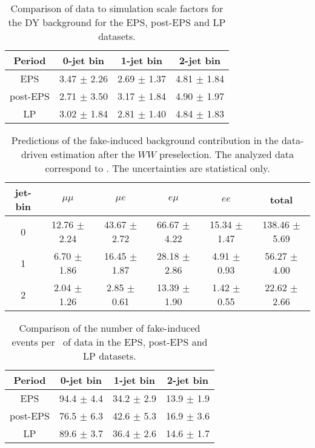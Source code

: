 \begin{table}[!htbp]
\begin{center}
\begin{tabular}{c c c c} 
\hline
Period & 0-jet bin & 1-jet bin & 2-jet bin \\ 
\hline
EPS      & 3.47 $\pm$ 2.26 & 2.69 $\pm$ 1.37 & 4.81 $\pm$ 1.84 \\
post-EPS & 2.71 $\pm$ 3.50 & 3.17 $\pm$ 1.84 & 4.90 $\pm$ 1.97 \\
LP       & 3.02 $\pm$ 1.84 & 2.81 $\pm$ 1.40 & 4.84 $\pm$ 1.83 \\
\hline
\end{tabular}
\caption{Comparison of data to simulation scale factors for the DY background for the EPS, post-EPS and LP datasets.}
\label{tab:lp_periods_dy}
\end{center}
\end{table}

\begin{table}[!htbp]
\begin{center}
\begin{tabular}{c c c c c c} 
\hline
jet-bin &	 $\mu\mu$ &	 $\mu e$ &	 $e\mu$ &	 $ee$ &	 total \\ 
\hline
0 &	 12.76 $\pm$ 2.24 &	 43.67 $\pm$ 2.72 &	 66.67 $\pm$ 4.22 &	 15.34 $\pm$ 1.47 &	 138.46 $\pm$ 5.69 \\
1 &	 6.70 $\pm$ 1.86  &      16.45 $\pm$ 1.87 &      28.18 $\pm$ 2.86 &       4.91 $\pm$ 0.93 &       56.27 $\pm$ 4.00 \\
2 &	 2.04 $\pm$ 1.26  &       2.85 $\pm$ 0.61 &      13.39 $\pm$ 1.90 &       1.42 $\pm$ 0.55 &       22.62 $\pm$ 2.66 \\
\hline
\end{tabular}
\caption{Predictions of the fake-induced background contribution 
in the data-driven estimation after the $WW$ preselection. 
The analyzed data correspond to \lpintlumi.
The uncertainties are statistical only.}
\label{tab:lp_fake_est}
\end{center}
\end{table}

\begin{table}[!htbp]
\begin{center}
\begin{tabular}{c c c c}
\hline
Period & 0-jet bin & 1-jet bin & 2-jet bin \\
\hline
EPS      & 94.4 $\pm$ 4.4 & 34.2 $\pm$ 2.9 & 13.9 $\pm$ 1.9 \\
post-EPS & 76.5 $\pm$ 6.3 & 42.6 $\pm$ 5.3 & 16.9 $\pm$ 3.6 \\
LP       & 89.6 $\pm$ 3.7 & 36.4 $\pm$ 2.6 & 14.6 $\pm$ 1.7 \\
\hline
\end{tabular}
\caption{Comparison of the number of fake-induced events per \ifb~of data in the EPS, post-EPS and LP datasets.}
\label{tab:lp_periods_fake}
\end{center}
\end{table}

